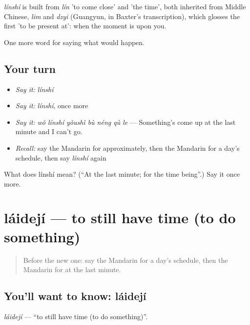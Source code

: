\begin{cousinweb}
\emph{línshí} is built from \emph{lín} 'to come close' and  'the time', both inherited from Middle Chinese, \emph{lim} and \emph{dzyi} (Guangyun, in Baxter's transcription), which glosses the first 'to be present at': when the moment is upon you.
\end{cousinweb}

\begin{grammarlens}[title={What you've built}]
One more word for saying what would happen.
\end{grammarlens}

\subsection*{Your turn}
\begin{itemize}
\raggedright
  \item \emph{Say it:} \emph{línshí}
  \item \emph{Say it:} \emph{línshí}, once more
  \item \emph{Say it:} \emph{wǒ línshí yǒushì bù néng qù le} — Something's come up at the last minute and I can't go.
  \item \emph{Recall:} say the Mandarin for approximately, then the Mandarin for a day's schedule, then say \emph{línshí} again
\end{itemize}

\begin{tcolorbox}[breakable,colback=teal!4,colframe=teal!35!black,title={Before you move on}]
What does línshí mean? (\textquotedblleft{}At the last minute; for the time being\textquotedblright{}.) Say it once more.
\end{tcolorbox}
\section[láidejí]{láidejí — to still have time (to do something)}

\label{lesson:ZH-C391-laideji}



\begin{quote}
Before the new one: say the Mandarin for a day's schedule, then the Mandarin for at the last minute.
\end{quote}

\subsection*{You'll want to know: láidejí}
\emph{láidejí} — \textquotedblleft{}to still have time (to do something)\textquotedblright{}.

